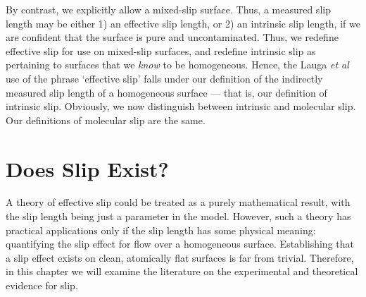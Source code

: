 \documentclass[12pt, a4paper, twoside, openright]{book}
\begin{document}
By contrast, we explicitly allow a mixed-slip surface. Thus, a measured slip length may be either 1) an effective slip length, or 2) an intrinsic slip length, if we are confident that the surface is pure and uncontaminated. Thus, we redefine effective slip for use on mixed-slip surfaces, and redefine intrinsic slip as pertaining to surfaces that we \emph{know} to be homogeneous.
Hence, the Lauga \emph{et al} use of the phrase `effective slip' falls under our definition of the indirectly measured slip length of a homogeneous surface --- that is, our definition of intrinsic slip. Obviously, we now distinguish between intrinsic and molecular slip. Our definitions of molecular slip are the same.


\chapter{Does Slip Exist?}




A theory of effective slip could be treated as a purely mathematical result, with the slip length being just a parameter in the model.  However, such a theory has practical applications only if the slip length has some physical meaning: quantifying the slip effect for flow over a homogeneous surface.  Establishing that a slip effect exists on clean, atomically flat surfaces is far from trivial.  Therefore, in this chapter we will examine the literature on the experimental and theoretical evidence for slip.
\end{document}

